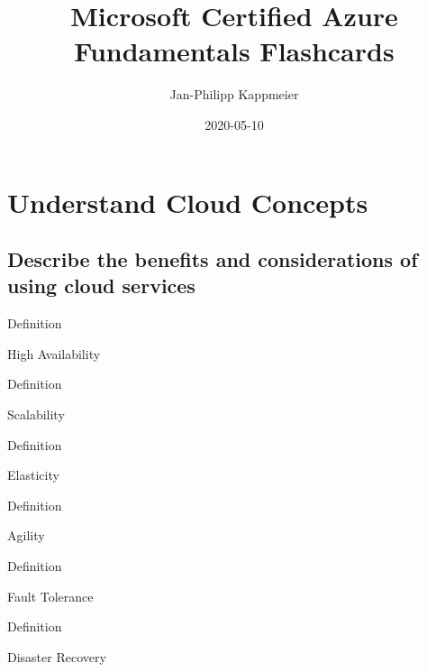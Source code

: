 \documentclass{scrartcl}
\newenvironment{flashcard}[2][]{%
    #1
    \vfill
    \centerline{\Large{#2}}
    \vfill
    \newpage
}
{\newpage}
\newcommand{\sectioncard}[1]{
    \vspace*{\stretch{1}}
    \section{#1}
    \vspace*{\stretch{1}}
    \pagebreak
}
\newcommand{\subsectioncard}[1]{
    \vspace*{\stretch{1}}
    \subsection{#1}
    \vspace*{\stretch{1}}
    \pagebreak
}
\begin{document}
    \title{Microsoft Certified Azure Fundamentals Flashcards}
    \date{2020-05-10}
    \author{Jan-Philipp Kappmeier}

    \clearpage\maketitle
    \thispagestyle{empty}
    \pagebreak

    \sectioncard{Understand Cloud Concepts}

    \subsectioncard{Describe the benefits and considerations of using cloud services}

    \begin{flashcard}[Definition]{High Availability}

    \end{flashcard}

    \begin{flashcard}[Definition]{Scalability}

    \end{flashcard}

    \begin{flashcard}[Definition]{Elasticity}

    \end{flashcard}

    \begin{flashcard}[Definition]{Agility}

    \end{flashcard}

    \begin{flashcard}[Definition]{Fault Tolerance}

    \end{flashcard}

    \begin{flashcard}[Definition]{Disaster Recovery}

    \end{flashcard}
\end{document}
